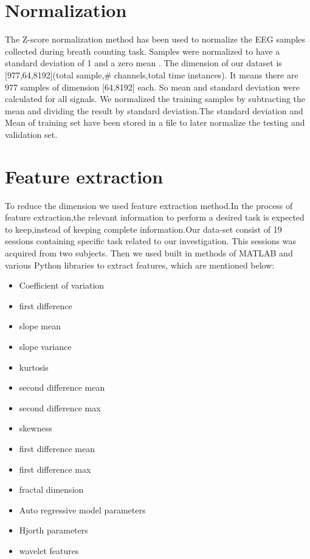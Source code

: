 \section{Normalization}
The Z-score normalization method has been used to normalize the EEG samples collected during breath counting task. Samples were normalized to have a standard deviation of 1 and a zero mean . The dimension of our dataset is [977,64,8192](total sample,\# channels,total time instances). It means there are 977 samples of dimension [64,8192] each. So mean and standard deviation were calculated for all signals. We normalized the  training samples by subtracting the mean and dividing the result by standard deviation.The standard deviation and Mean of training set have been stored in a file to later normalize the testing and validation set.

\section{Feature extraction}
To reduce the dimension we used feature extraction method.In the process of feature extraction,the relevant information to perform a desired task is expected to keep,instead of keeping complete information.Our data-set consist of 19 sessions containing specific task related to our investigation. This sessions was acquired from two subjects. Then we used built in methods of MATLAB and various Python libraries to extract features, which are mentioned below:


\begin{itemize}
    \item Coefficient of variation
    \item first difference
    \item slope mean
    \item slope variance
    \item kurtosis
    \item second difference mean
    \item second difference max
    \item skewness
    \item first difference mean
    \item first difference max
    \item fractal dimension
    \item Auto regressive model parameters 
    \item Hjorth parameters
    \item wavelet features
    
\end{itemize}
